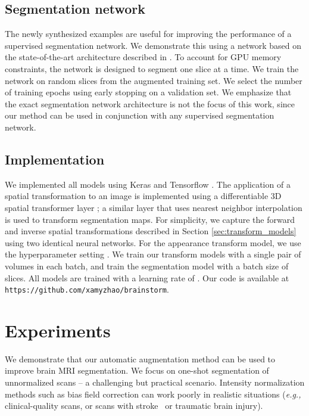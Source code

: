 \documentclass[10pt,twocolumn,letterpaper]{article}
\begin{document}
\subsection{Segmentation network}
The newly synthesized examples are useful for improving the performance of a supervised segmentation network. We demonstrate this using a network based on the state-of-the-art architecture described in \cite{roy2017error}. To account for GPU memory constraints, the network is designed to segment one slice at a time. We train the network on random slices from the augmented training set. We select the number of training epochs using early stopping on a validation set. We emphasize that the exact segmentation network architecture is not the focus of this work, since our method can be used in conjunction with any supervised segmentation network.

\subsection{Implementation}
We implemented all models using Keras \cite{chollet2015} and Tensorflow \cite{abadi2016}. The application of a spatial transformation to an image is implemented using a differentiable 3D spatial transformer layer \cite{balakrishnan2018unsupervised}; a similar layer that uses nearest neighbor interpolation is used to transform segmentation maps. For simplicity, we capture the forward and inverse spatial transformations described in Section \ref{sec:transform_models} using two identical neural networks. For the appearance transform model, we use the hyperparameter setting . We train our transform models with a single pair of volumes in each batch, and train the segmentation model with a batch size of  slices. All models are trained with a learning rate of . Our code is available at \texttt{https://github.com/xamyzhao/brainstorm}. \section{Experiments}\label{sec:results}
We demonstrate that our automatic augmentation method can be used to improve brain MRI segmentation. We focus on one-shot segmentation of unnormalized scans -- a challenging but practical scenario. Intensity normalization methods such as bias field correction \cite{fischl2012,sled1998nonparametric,styner2000parametric} can work poorly in realistic situations (\textit{e.g.,} clinical-quality scans, or scans with stroke~\cite{sridharan2013quantification} or traumatic brain injury). 
\end{document}
